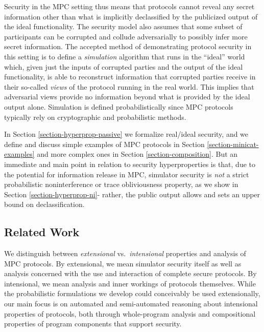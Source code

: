 Security in the MPC setting thus means that protocols cannot reveal
any secret information other than what is implicitly declassified by
the publicized output of the ideal functionality. The security model
also assumes that some subset of participants can be corrupted and
collude adversarially to possibly infer more secret information. The
accepted method of demonstrating protocol security in this setting is
to define a \emph{simulation} algorithm that runs in the ``ideal''
world which, given just the inputs of corrupted parties and the output
of the ideal functionality, is able to reconstruct information that
corrupted parties receive in their so-called \emph{views} of the
protocol running in the real world.  This implies that adversarial
views provide no information beyond what is provided by the ideal
output alone. Simulation is defined probabilistically since MPC
protocols typically rely on cryptographic and probabilistic methods.

In Section \ref{section-hyperprop-passive} we formalize real/ideal
security, and we define and discuss simple examples of MPC protocols
in Section \ref{section-minicat-examples} and more complex ones in
Section \ref{section-composition}. But an immediate and main point in
relation to security hyperproperties is that, due to the potential for
information release in MPC, simulator security is \emph{not} a strict
probabilistic noninterference or trace obliviousness property, as we
show in Section \ref{section-hyperprop-ni}- rather, the public output
allows and sets an upper bound on declassification.

\subsection{Related Work}

We distinguish between \emph{extensional} vs.~\emph{intensional}
properties and analysis of MPC protocols. By extensional, we mean
simulator security itself as well as analysis concerned with the use
and interaction of complete secure protocols. By intensional, we mean
analysis and inner workings of protocols themselves. While the
probabilistic formulations we develop could conceivably be used
extensionally, our main focus is on automated and semi-automated
reasoning about intensional properties of protocols, both through
whole-program analysis and compositional properties of program
components that support security. 

